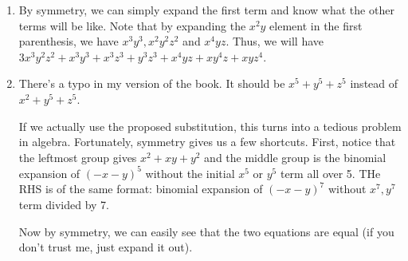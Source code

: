\setcounter{Exercise}{5}

\begin{Exercise}
	\begin{enumerate}
		\item By symmetry, we can simply expand the first term and know what the other terms will be like.
		Note that by expanding the $x^2y$ element in the first parenthesis, we have $x^3y^3, x^2y^2z^2$ and $x^4yz$.
		Thus, we will have $3x^3y^2z^2 + x^3y^3 + x^3z^3 + y^3z^3 + x^4yz + xy^4z + xyz^4$.

		\item There's a typo in my version of the book.
		It should be $x^5 + y^5 + z^5$ instead of $x^2 + y^5 + z^5$.

		If we actually use the proposed substitution, this turns into a tedious problem in algebra.
		Fortunately, symmetry gives us a few shortcuts.
		First, notice that the leftmost group gives $x^2 + xy + y^2$ and the middle group is the binomial expansion of $(-x-y)^5$ without the initial $x^5$ or $y^5$ term all over 5. 
		THe RHS is of the same format: binomial expansion of $(-x-y)^7$ without $x^7, y^7$ term divided by 7.

		Now by symmetry, we can easily see that the two equations are equal (if you don't trust me, just expand it out).
	\end{enumerate}
\end{Exercise}